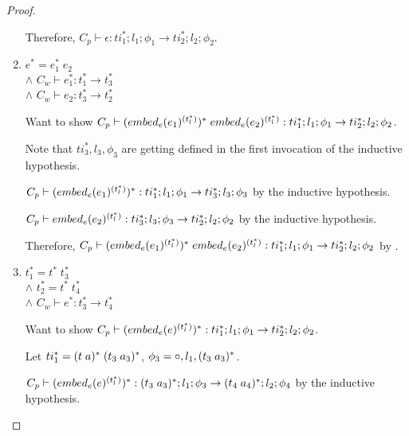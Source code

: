 \begin{proof}
\begin{enumerate}
        Therefore, $C_p \vdash \epsilon : ti_1^{*};l_1;\phi_1 \rightarrow ti_2^{*};l_2;\phi_2$.

        \item $e^{*} = e_1^{*}\; e_2$
        \\ $\land$ $C_w \vdash e_1^{*} : t_1^{*} \rightarrow t_3^{*}$
        \\ $\land$ $C_w \vdash e_2 : t_3^{*} \rightarrow t_2^{*}$

        Want to show $C_p \vdash (\embed[e]{e_1}^{(t_l^{*})})^{*}\; \embed[e]{e_2}^{(t_l^{*})} : ti_1^{*};l_1;\phi_1 \rightarrow ti_2^{*};l_2;\phi_2$.

        Note that $ti_3^{*}, l_3, \phi_3$ are getting defined in the first invocation of the inductive hypothesis.

        $C_p \vdash (\embed[e]{e_1}^{(t_l^{*})})^{*} : ti_1^{*};l_1;\phi_1 \rightarrow ti_3^{*};l_3;\phi_3$ by the inductive hypothesis.

        $C_p \vdash \embed[e]{e_2}^{(t_l^{*})} : ti_3^{*};l_3;\phi_3 \rightarrow ti_2^{*};l_2;\phi_2$ by the inductive hypothesis.


        Therefore, $C_p \vdash (\embed[e]{e_1}^{(t_l^{*})})^{*}\; \embed[e]{e_2}^{(t_l^{*})} : ti_1^{*};l_1;\phi_1 \rightarrow ti_2^{*};l_2;\phi_2$ by .

        \item $t_1^{*} = t^{*}\; t_3^{*}$
        \\ $\land$ $t_2^{*} = t^{*}\; t_4^{*}$
        \\ $\land$ $C_w \vdash e^{*} : t_3^{*} \rightarrow t_4^{*}$

        Want to show $C_p \vdash (\embed[e]{e}^{(t_l^{*})})^{*} : ti_1^{*};l_1;\phi_1 \rightarrow ti_2^{*};l_2;\phi_2$.

        Let $ti_1^{*} = \ti{t}{a}^{*}\; \ti{t_3}{a_3}^{*}$, $\phi_3 = \circ,l_1,\ti{t_3}{a_3}^{*}$.

        $C_p \vdash (\embed[e]{e}^{(t_l^{*})})^{*} : \ti{t_3}{a_3}^{*};l_1;\phi_3 \rightarrow \ti{t_4}{a_4}^{*};l_2;\phi_4$ by the inductive hypothesis.


\end{enumerate}
\end{proof}
